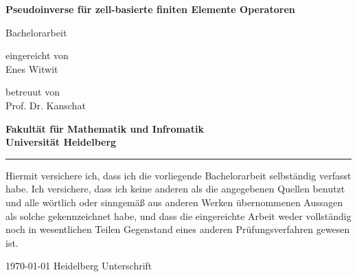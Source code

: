 \documentclass[12pt,a4paper]{scrartcl}
\numberwithin{equation}{section}
\begin{document}
\pagestyle{empty}




\begin{titlepage}

\vspace*{1cm} 
\begin{center} 


\textbf{\Huge Pseudoinverse für zell-basierte finiten Elemente Operatoren} 
\vspace*{2cm}

{\Large Bachelorarbeit}
\vspace*{1cm}


eingereicht von \\[0.5cm]

{\Large Enes Witwit}
\vspace*{1cm}

betreuut von  \\[0.5cm]
{\Large Prof. Dr. Kanschat}
\vspace*{3cm}

\textbf{
Fakultät für Mathematik und Infromatik\\[1cm]
Universität Heidelberg}
\end{center}
\end{titlepage}



\newpage
\thispagestyle{empty}
\vspace*{14cm}

\noindent\rule{16cm}{0.4pt}

Hiermit versichere ich, dass ich die vorliegende Bachelorarbeit selbständig
verfasst habe.
Ich versichere, dass ich keine anderen als die angegebenen Quellen benutzt und
alle wörtlich oder sinngemäß aus anderen Werken übernommenen Aussagen als
solche gekennzeichnet habe, und dass die eingereichte Arbeit weder vollständig
noch in wesentlichen Teilen Gegenstand eines anderen Prüfungsverfahren
gewesen ist. \\[2ex] 

\noindent

\today \hspace*{1cm}  Heidelberg \hspace*{5cm} Unterschrift\\[5ex]

\end{document}
